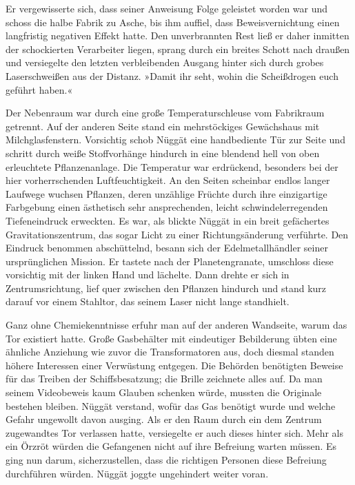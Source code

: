 Er vergewisserte sich, dass seiner Anweisung Folge geleistet worden war und schoss die halbe Fabrik zu Asche, bis ihm auffiel, dass Beweisvernichtung einen langfristig negativen Effekt hatte. Den unverbrannten Rest ließ er daher inmitten der schockierten Verarbeiter liegen, sprang durch ein breites Schott nach draußen und versiegelte den letzten verbleibenden Ausgang hinter sich durch grobes Laserschweißen aus der Distanz. »Damit ihr seht, wohin die Scheißdrogen euch geführt haben.«

Der Nebenraum war durch eine große Temperaturschleuse vom Fabrikraum getrennt. Auf der anderen Seite stand ein mehrstöckiges Gewächshaus mit Milchglasfenstern. Vorsichtig schob Nüggät eine handbediente Tür zur Seite und schritt durch weiße Stoffvorhänge hindurch in eine blendend hell von oben erleuchtete Pflanzenanlage. Die Temperatur war erdrückend, besonders bei der hier vorherrschenden Luftfeuchtigkeit. An den Seiten scheinbar endlos langer Laufwege wuchsen Pflanzen, deren unzählige Früchte durch ihre einzigartige Farbgebung einen ästhetisch sehr ansprechenden, leicht schwindelerregenden Tiefeneindruck erweckten. Es war, als blickte Nüggät in ein breit gefächertes Gravitationszentrum, das sogar Licht zu einer Richtungsänderung verführte. Den Eindruck benommen abschüttelnd, besann sich der Edelmetallhändler seiner ursprünglichen Mission. Er tastete nach der Planetengranate, umschloss diese vorsichtig mit der linken Hand und lächelte. Dann drehte er sich in Zentrumsrichtung, lief quer zwischen den Pflanzen hindurch und stand kurz darauf vor einem Stahltor, das seinem Laser nicht lange standhielt.

Ganz ohne Chemiekenntnisse erfuhr man auf der anderen Wandseite, warum das Tor existiert hatte. Große Gasbehälter mit eindeutiger Bebilderung übten eine ähnliche Anziehung wie zuvor die Transformatoren aus, doch diesmal standen höhere Interessen einer Verwüstung entgegen. Die Behörden benötigten Beweise für das Treiben der Schiffsbesatzung; die Brille zeichnete alles auf. Da man seinem Videobeweis kaum Glauben schenken würde, mussten die Originale bestehen bleiben. Nüggät verstand, wofür das Gas benötigt wurde und welche Gefahr ungewollt davon ausging. Als er den Raum durch ein dem Zentrum zugewandtes Tor verlassen hatte, versiegelte er auch dieses hinter sich. Mehr als ein Örzröt würden die Gefangenen nicht auf ihre Befreiung warten müssen. Es ging nun darum, sicherzustellen, dass die richtigen Personen diese Befreiung durchführen würden. Nüggät joggte ungehindert weiter voran.

